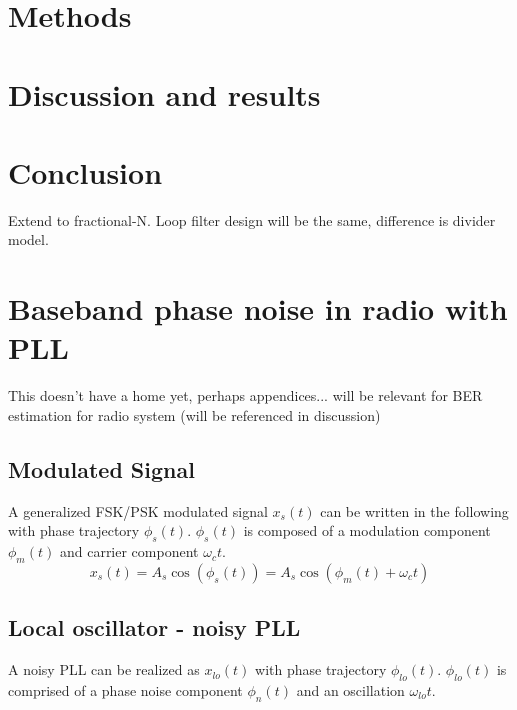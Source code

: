 	\section{Methods}\label{methods}
	

	\section{Discussion and results}\label{disco}
    

    \FloatBarrier

    \section{Conclusion} \label{conclusion}
    Extend to fractional-N. Loop filter design will be the same, difference is divider model.

	\section{Baseband phase noise in radio with PLL}
		This doesn't have a home yet, perhaps appendices... will be relevant for BER estimation for radio system (will be referenced in discussion)

	\subsection{Modulated Signal}
		A generalized FSK/PSK modulated signal $x_s(t)$ can be written in the following with phase trajectory $\phi_s(t)$. $\phi_s(t)$ is composed of a modulation component $\phi_m(t)$ and carrier component $\omega_ct$.
		\begin{equation}
			x_s(t) = A_s\cos(\phi_s(t)) = A_s\cos(\phi_m(t)+\omega_ct)
		\end{equation} 

	\subsection{Local oscillator - noisy PLL}
		A noisy PLL can be realized as $x_{lo}(t)$ with phase trajectory $\phi_{lo}(t)$. $\phi_{lo}(t)$ is comprised of a phase noise component $\phi_{n}(t)$ and an oscillation $\omega_{lo}t$. 


